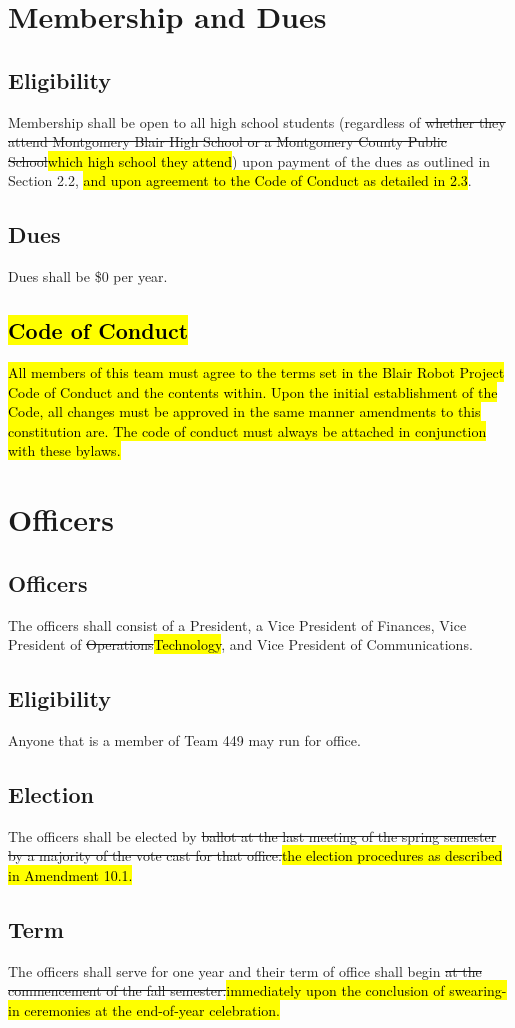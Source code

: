 \documentclass[12pt, a4paper]{article}
\begin{document}
\section{Membership and Dues}
\subsection{Eligibility}
Membership shall be open to all high school students (regardless of \st{whether they attend Montgomery Blair High School or a Montgomery County Public School}\hl{which high school they attend}) upon payment of the dues as outlined in Section 2.2, \hl{and upon agreement to the Code of Conduct as detailed in 2.3}.
\subsection{Dues}
Dues shall be \$0 per year.
\subsection{\hl{Code of Conduct}}
\hl{All members of this team must agree to the terms set in the Blair Robot Project Code of Conduct and the contents within. 
Upon the initial establishment of the Code, all changes must be approved in the same manner amendments to this constitution are. 
The code of conduct must always be attached in conjunction with these bylaws.}
\section{Officers}
\subsection{Officers}
The officers shall consist of a President, a Vice President of Finances, Vice President of \st{Operations}\hl{Technology}, and Vice President of Communications.
\subsection{Eligibility}
Anyone that is a member of Team 449 may run for office.  
\subsection{Election}
The officers shall be elected by \st{ballot at the last meeting of the spring semester by a majority of the vote cast for that office.}\hl{the election procedures as described in Amendment 10.1.}
\subsection{Term}
The officers shall serve for one year and their term of office shall begin \st{at the commencement of the fall semester.}\hl{immediately upon the conclusion of swearing-in ceremonies at the end-of-year celebration.}
\end{document}

